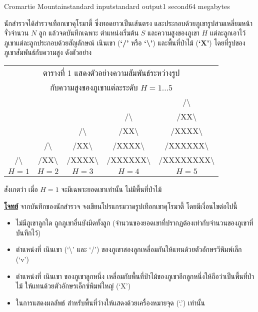 \documentclass[11pt,a4paper]{article}
\begin{document}
\begin{problem}{Cromartie Mountain}{standard input}{standard output}{1 second}{64 megabytes}

นักสำรวจได้สำรวจเทือกเขาคุโรมาตี้ ซึ่งทอดยาวเป็นเส้นตรง และประกอบด้วยภูเขารูปสามเหลี่ยมหน้าจั่วจำนวน $N$ ลูก แล้วจดบันทึกเฉพาะ ตำแหน่งเริ่มต้น $S$ และความสูงของภูเขา $H$ แต่ละลูกเอาไว้ ภูเขาแต่ละลูกประกอบด้วยสัญลักษณ์ เนินเขา (\textbf{‘/’} หรือ \textbf{‘\textbackslash’}) และพื้นที่ป่าไม้ (\textbf{‘X’}) โดยที่รูปของภูเขาสัมพันธ์กับความสูง ดังตัวอย่าง

\begin{center}
\begin{tabular}{|c|c|c|c|c|}
\hline
\multicolumn{5}{|c|}{ตารางที่ 1 แสดงตัวอย่างความสัมพันธ์ระหว่างรูป}\\
\multicolumn{5}{|c|}{กับความสูงของภูเขาแต่ละระดับ $H = 1 … 5$}\\
\hline \hline
& & & &/\textbackslash \\
& & & /\textbackslash & /XX\textbackslash\\
& & /\textbackslash & /XX\textbackslash & /XXXX\textbackslash\\
& /\textbackslash & /XX\textbackslash & /XXXX\textbackslash &/XXXXXX\textbackslash\\
/\textbackslash & /XX\textbackslash & /XXXX\textbackslash & /XXXXXX\textbackslash & /XXXXXXXX\textbackslash \\
\hline
$H = 1$ & $H = 2$ & $H = 3$ & $H = 4$ & $H = 5$ \\
\hline
\end{tabular}
\end{center}

สังเกตว่า เมื่อ $H=1$ จะมีเฉพาะยอดเขาเท่านั้น ไม่มีพื้นที่ป่าไม้

\bigskip
\underline{\textbf{โจทย์}}  จากบันทึกของนักสำรวจ จงเขียนโปรแกรมวาดรูปเทือกเขาคุโรมาตี้ โดยมีเงื่อนไขต่อไปนี้
\begin{itemize}
\item ไม่มีภูเขาลูกใด ถูกภูเขาอื่นบังมิดทั้งลูก (จำนวนของยอดเขาที่ปรากฏต้องเท่ากับจำนวนของภูเขาที่บันทึกไว้)
\item ตำแหน่งที่ เนินเขา (‘\textbackslash’ และ ‘/’) ของภูเขาสองลูกเหลื่อมกันให้แทนด้วยตัวอักษรวีพิมพ์เล็ก (‘v’)
\item ตำแหน่งที่ เนินเขา ของภูเขาลูกหนึ่ง เหลื่อมกับพื้นที่ป่าไม้ของภูเขาอีกลูกหนึ่งให้ถือว่าเป็นพื้นที่ป่าไม้ ให้แทนด้วยตัวอักษรเอ็กซ์พิมพ์ใหญ่ (‘X’)
\item ในการแสดงผลลัพธ์ สำหรับพื้นที่ว่างให้แสดงด้วยเครื่องหมายจุด (‘.’) เท่านั้น
\end{itemize}


\end{problem}
\end{document}

